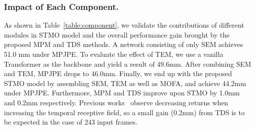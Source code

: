 \documentclass[]{llncs}
\begin{document}
\subsubsection{Impact of Each Component.} 
As shown in Table~\ref{table:component}, we validate the contributions of different modules in STMO model and the overall performance gain brought by the proposed MPM and TDS methods. A network consisting of only SEM achieves 51.0 mm under MPJPE. To evaluate the effect of TEM, we use a vanilla Transformer as the backbone and yield a result of 49.6mm. After combining SEM and TEM, MPJPE drops to 46.0mm. Finally, we end up with the proposed STMO model by assembling SEM, TEM as well as MOFA, and achieve 44.2mm under MPJPE. Furthermore, MPM and TDS improve upon STMO by 1.0mm and 0.2mm respectively. Previous works~\cite{pavllo20193d,liu2020attention} observe decreasing returns when increasing the temporal receptive field, so a small gain (0.2mm) from TDS is to be expected in the case of 243 input frames.
\end{document}
